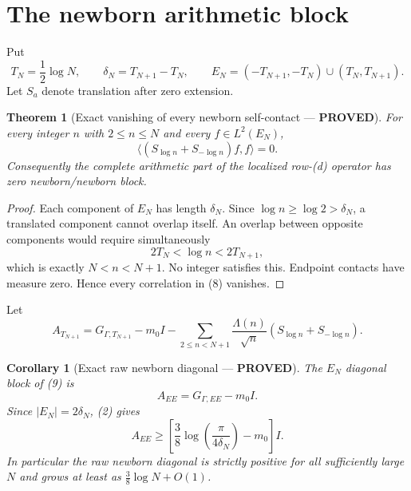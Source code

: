 \documentclass[11pt]{article}
\newcommand{\PROVED}{\textcolor{green!40!black}{\textbf{PROVED}}}
\newtheorem{theorem}{Theorem}
\newtheorem{corollary}{Corollary}
\begin{document}
\section{The newborn arithmetic block}

Put
\begin{equation}
 T_N=\frac12\log N,
 \qquad \delta_N=T_{N+1}-T_N,
 \qquad
 E_N=(-T_{N+1},-T_N)\cup(T_N,T_{N+1}).                       \tag{7}
\end{equation}
Let $S_a$ denote translation after zero extension.

\begin{theorem}[Exact vanishing of every newborn self-contact ---
\PROVED]
For every integer $n$ with $2\le n\le N$ and every
$f\in L^2(E_N)$,
\begin{equation}
                    \langle(S_{\log n}+S_{-\log n})f,f\rangle=0.
                                                                    \tag{8}
\end{equation}
Consequently the complete arithmetic part of the localized row-(d)
operator has zero newborn/newborn block.
\end{theorem}

\begin{proof}
Each component of $E_N$ has length $\delta_N$.  Since
$\log n\ge\log2>\delta_N$, a translated component cannot overlap itself.
An overlap between opposite components would require simultaneously
\[
 2T_N<\log n<2T_{N+1},
\]
which is exactly $N<n<N+1$.  No integer satisfies this.  Endpoint contacts
have measure zero.  Hence every correlation in (8) vanishes.
\end{proof}

Let
\begin{equation}
 A_{T_{N+1}}=G_{\Gamma,T_{N+1}}-m_0I-
 \sum_{2\le n<N+1}\frac{\Lambda(n)}{\sqrt n}
        (S_{\log n}+S_{-\log n}).                            \tag{9}
\end{equation}

\begin{corollary}[Exact raw newborn diagonal --- \PROVED]
The $E_N$ diagonal block of (9) is
\begin{equation}
                         A_{EE}=G_{\Gamma,EE}-m_0I.           \tag{10}
\end{equation}
Since $|E_N|=2\delta_N$, (2) gives
\begin{equation}
 A_{EE}\ge
 \left[
  \frac38\log\!\left(\frac{\pi}{4\delta_N}\right)
  -m_0\right]I.                                             \tag{11}
\end{equation}
In particular the raw newborn diagonal is strictly positive for all
sufficiently large $N$ and grows at least as
$\frac38\log N+O(1)$.
\end{corollary}
\end{document}
